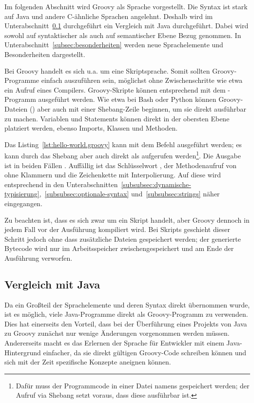 Im folgenden Abschnitt wird Groovy als Sprache vorgestellt.
Die Syntax ist stark auf Java und andere C-ähnliche Sprachen angelehnt.
Deshalb wird im Unterabschnitt~\ref{subsec:vergleichMitJava} durchgeführt ein Vergleich mit Java durchgeführt.
Dabei wird sowohl auf syntaktischer als auch auf semantischer Ebene Bezug genommen.
In Unterabschnitt~\ref{subsec:besonderheiten} werden neue Sprachelemente und Besonderheiten dargestellt.

Bei Groovy handelt es sich {u.a.} um eine Skriptsprache.
Somit sollten Groovy-Programme einfach auszuführen sein, möglichst ohne Zwischenschritte wie etwa ein Aufruf eines Compilers.
Groovy-Skripte können entsprechend mit dem -Programm ausgeführt werden.
Wie etwa bei Bash oder Python können Groovy-Dateien () aber auch mit einer Shebang-Zeile beginnen, um sie direkt ausführbar zu machen.
Variablen und Statements können direkt in der obersten Ebene platziert werden, ebenso Imports, Klassen und Methoden.


Das Listing~\ref{lst:hello-world.groovy} kann mit dem Befehl  ausgeführt werden;
es kann durch das Shebang aber auch direkt als  aufgerufen werden\footnote{Dafür muss der Programmcode in einer Datei namens  gespeichert werden;
der Aufruf via Shebang setzt voraus, dass diese ausführbar ist.}.
Die Ausgabe ist in beiden Fällen .
Auffällig ist das Schlüsselwort , der Methodenaufruf von  ohne Klammern und die Zeichenkette mit Interpolierung.
Auf diese wird entsprechend in den Unterabschnitten~\ref{subsubsec:dynamische-typisierung},~\ref{subsubsec:optionale-syntax} und~\ref{subsubsec:strings} näher eingegangen.

Zu beachten ist, dass es sich zwar um ein Skript handelt, aber Groovy dennoch in jedem Fall vor der Ausführung kompiliert wird.
Bei Skripts geschieht dieser Schritt jedoch ohne dass zusätzliche Dateien gespeichert werden;
der generierte Bytecode wird nur im Arbeitsspeicher zwischengespeichert und am Ende der Ausführung verworfen.

\subsection{Vergleich mit Java}\label{subsec:vergleichMitJava}

Da ein Großteil der Sprachelemente und deren Syntax direkt übernommen wurde, ist es möglich, viele Java-Programme direkt als Groovy-Programm zu verwenden.
Dies hat einerseits den Vorteil, dass bei der Überführung eines Projekts von Java zu Groovy zunächst nur wenige Änderungen vorgenommen werden müssen.
Andererseits macht es das Erlernen der Sprache für Entwickler mit einem Java-Hintergrund einfacher, da sie direkt gültigen Groovy-Code schreiben können und sich mit der Zeit spezifische Konzepte aneignen können.

